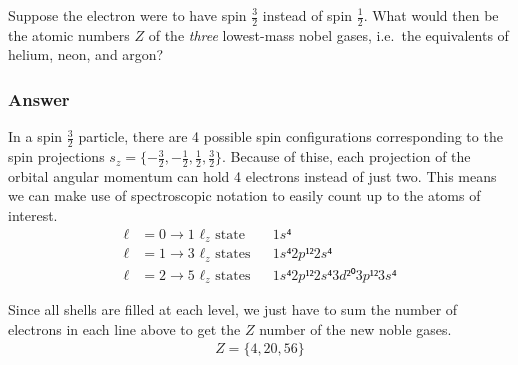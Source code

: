 Suppose the electron were to have spin $\frac 32$ instead of spin $\frac 12$.
What would then be the atomic numbers $Z$ of the \emph{three} lowest-mass
nobel gases, i.e.~the equivalents of helium, neon, and argon?

\subsubsection{Answer}

In a spin $\frac 32$ particle, there are 4 possible spin configurations
corresponding to the spin projections $s_z = \{ -\frac 32, -\frac 12, \frac 12,
\frac 32\}$. Because of thise, each projection of the orbital angular momentum
can hold 4 electrons instead of just two. This means we can make use of
spectroscopic notation to easily count up to the atoms of interest.
\begin{align*}
    ℓ &= 0 → \text{1 $ℓ_z$ state}	& & 1s⁴ \\
    ℓ &= 1 → \text{3 $ℓ_z$ states}	& & 1s⁴2p¹²2s⁴ \\
    ℓ &= 2 → \text{5 $ℓ_z$ states}	& & 1s⁴2p¹²2s⁴3d²⁰3p¹²3s⁴
\end{align*}

Since all shells are filled at each level, we just have to sum the number of
electrons in each line above to get the $Z$ number of the new noble gases.
\begin{align}
    \boxed{ Z = \{4, 20, 56 \} }
\end{align}
